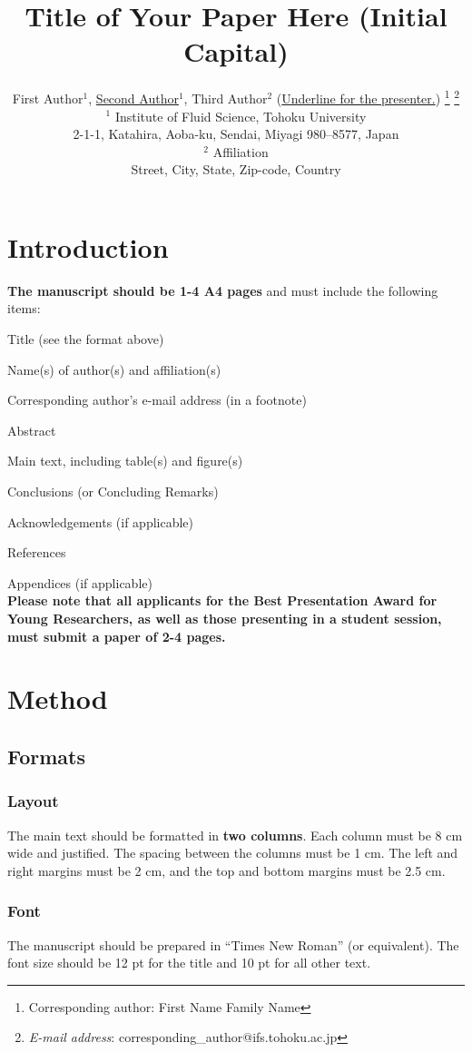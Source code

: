 \documentclass[10pt,twocolumn]{icfd2026paper}
\title{Title of Your Paper Here (Initial Capital)}
\author{First Author${}^1$,
\underline{Second Author}${}^1$, Third Author${}^2$ (\underline{Underline for the presenter.})
%
\footnote{\normalsize Corresponding author: First Name Family Name}
\footnote{\normalsize {\textit{E-mail address}}:  corresponding\_author@ifs.tohoku.ac.jp}
\\
${}^1$ Institute of Fluid Science, Tohoku University \\
2-1-1, Katahira, Aoba-ku, Sendai, Miyagi 980--8577, Japan \\
${}^2$ Affiliation \\
Street, City, State, Zip-code, Country
}
\begin{document}
\maketitle
\thispagestyle{empty}

\section{Introduction}

\textbf{The manuscript should be 1-4 A4 pages} and must include the following items:

Title (see the format above)

Name(s) of author(s) and affiliation(s)

Corresponding author's e-mail address (in a footnote)

Abstract

Main text, including table(s) and figure(s)

Conclusions (or Concluding Remarks)

Acknowledgements (if applicable)

References

Appendices (if applicable)\\

\textbf{Please note that all applicants for the Best Presentation Award for Young Researchers, as well as those presenting in a student session, must submit a paper of 2-4 pages.}

\section{Method}
\subsection{Formats}
\subsubsection{Layout}
The main text should be formatted in \textbf{two columns}. Each column must be 8 cm wide and justified. The spacing between the columns must be 1 cm. The left and right margins must be 2 cm, and the top and bottom margins must be 2.5 cm.

\subsubsection{Font}
The manuscript should be prepared in “Times New Roman” (or equivalent).
The font size should be 12 pt for the title and 10 pt for all other text.
\end{document}
